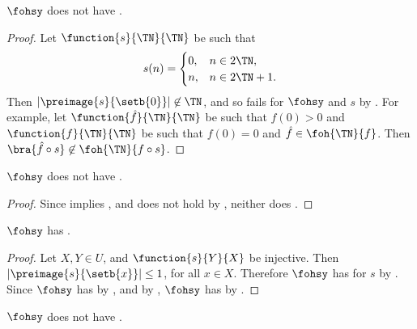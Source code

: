 \documentclass[b5paper, english, oneside]{memoir}
\begin{document}
\begin{theorem}
\label{CofiniteSubComposabilityFails}
$\fohsy$ does not have .
\end{theorem}

\begin{proof}
Let $\function{s}{\TN}{\TN}$ be such that
\begin{equation}
s(n) =
\begin{cases}
0, & n \in 2\TN, \\
n, & n \in 2\TN + 1.
\end{cases}
\end{equation}
Then $|\preimage{s}{\setb{0}}| \not\in \TN$, and so  fails for $\fohsy$ and $s$ by . For example, let $\function{\hat{f}}{\TN}{\TN}$ be such that $\hat{f}(0) > 0$ and $\function{f}{\TN}{\TN}$ be such that $f(0) = 0$ and $\hat{f} \in \foh{\TN}{f}$. Then $\bra{\hat{f} \circ s} \not\in \foh{\TN}{f \circ s}$.
\end{proof}

\begin{theorem}
\label{CofiniteSubsetSumFails}
$\fohsy$ does not have .
\end{theorem}

\begin{proof}
Since  implies , and  does not hold by , neither does .
\end{proof}

\begin{theorem}
\label{CofiniteInjectiveComposition}
$\fohsy$ has .
\end{theorem}

\begin{proof}
Let $X, Y \in U$, and $\function{s}{Y}{X}$ be injective. Then $|\preimage{s}{\setb{x}}| \leq 1$, for all $x \in X$. Therefore $\fohsy$ has  for $s$ by . 
  
Since $\fohsy$ has  by , and  by , $\fohsy$ has  by .
\end{proof}

\begin{theorem}
\label{CofiniteExtensibilityFails}
$\fohsy$ does not have .
\end{theorem}
\end{document}
